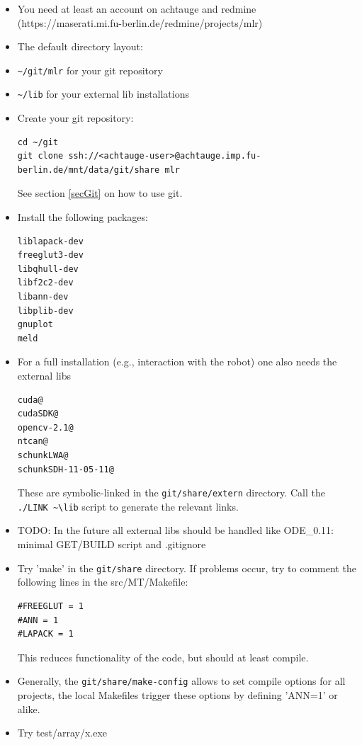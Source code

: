 \begin{itemize}
\item You need at least an account on achtauge and redmine
  (https://maserati.mi.fu-berlin.de/redmine/projects/mlr)

\item The default directory layout:
\bi
\item \verb+~/git/mlr+ for your git repository
\item \verb+~/lib+ for your external lib installations
\ei

\item Create your git repository:
\begin{code}
\begin{verbatim}
cd ~/git
git clone ssh://<achtauge-user>@achtauge.imp.fu-berlin.de/mnt/data/git/share mlr
\end{verbatim}
\end{code}
See section \ref{secGit} on how to use git.

\item Install the following packages:
\begin{code}
\begin{verbatim}
liblapack-dev
freeglut3-dev
libqhull-dev
libf2c2-dev
libann-dev
libplib-dev
gnuplot
meld
\end{verbatim}
\end{code}


\item For a full installation (e.g., interaction with the robot) one also
  needs the external libs
\begin{code}
\begin{verbatim}
cuda@
cudaSDK@
opencv-2.1@
ntcan@
schunkLWA@
schunkSDH-11-05-11@ 
\end{verbatim}
\end{code}

These are symbolic-linked in the \verb+git/share/extern+ directory. Call the
  \verb+./LINK ~\lib+ script to generate the relevant links.

\item TODO: In the future all external libs should be handled like
  ODE\_0.11: minimal GET/BUILD script and .gitignore

\item Try 'make' in the \verb+git/share+ directory. If problems occur, try to
comment the following lines in the src/MT/Makefile:
\begin{code}
\begin{verbatim}
#FREEGLUT = 1
#ANN = 1
#LAPACK = 1
\end{verbatim}
\end{code}

This reduces functionality of the code, but should at least compile.

\item Generally, the \verb+git/share/make-config+ allows to set compile
options for all projects, the local Makefiles trigger these options by
defining 'ANN=1' or alike.

\item Try test/array/x.exe
\end{itemize}

